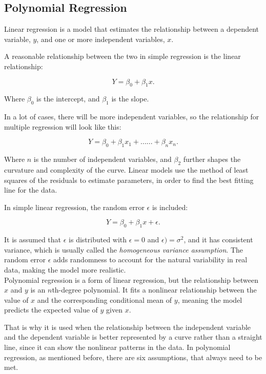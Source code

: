 
\subsection*{Polynomial Regression}
Linear regression is a model that estimates the relationship between a dependent variable, \( y \), and one or more independent variables, \( x \).

\noindent A reasonable relationship between the two in simple regression is the linear relationship:

\[
Y = \beta_0 + \beta_1 x .
\]

\noindent Where \( \beta_0 \) is the intercept, and \( \beta_1 \) is the slope.

\noindent In a lot of cases, there will be more independent variables, so the relationship for multiple regression will look like this:

\[
Y = \beta_0 + \beta_1 x_1 + ......+ \beta_n x_n .
\]



\noindent Where \( n \) is the number of independent variables, and $\beta_2$ further shapes the curvature and complexity of the curve. Linear models use the method of least squares of the residuals to estimate parameters, in order to find the best fitting line for the data.

\noindent In simple linear regression, the random error \( \epsilon \) is included:

\[
Y = \beta_0 + \beta_1 x + \epsilon .
\]

\noindent It is assumed that \( \epsilon \) is distributed with $\epsilon = 0$ and $\epsilon) = \sigma^2$, and it has consistent variance, which is usually called the \textit{homogeneous variance assumption}. The random error \( \epsilon \) adds randomness to account for the natural variability in real data, making the model more realistic.
\newline\\
Polynomial regression is a form of linear regression, but the relationship between \( x \) and \( y \) is an \( n \)th-degree polynomial. It fits a nonlinear relationship between the value of \( x \) and the corresponding conditional mean of \( y \), meaning the model predicts the expected value of \( y \) given \( x \). \newline

\noindent That is why it is used when the relationship between the independent variable and the dependent variable is better represented by a curve rather than a straight line, since it can show the nonlinear patterns in the data.
In polynomial regression, as mentioned before, there are six assumptions, that always need to be met.



